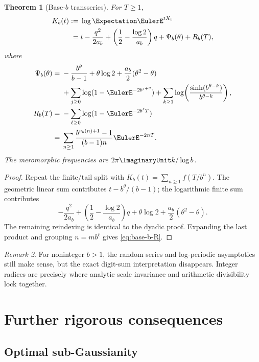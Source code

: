 \documentclass[11pt,oneside]{article}
\newtheorem{theorem}{Theorem}[section]
\theoremstyle{definition}
\theoremstyle{remark}
\newtheorem{remark}[theorem]{Remark}
\begin{document}
\begin{theorem}[Base-\(b\) transseries]
\label{thm:base-b-transseries}
For \(T\geq1\),
\begin{align}
 K_b(t)
 :={}&\log\Expectation\EulerE^{tX_b}
 \notag\\
 ={}&
 t-\frac{q^2}{2a_b}
 +\left(\frac12-\frac{\log2}{a_b}\right)q
 +\Psi_b(\theta)+R_b(T),
 \label{eq:base-b-K}
\end{align}
where
\begin{align}
 \Psi_b(\theta)
 ={}&
 -\frac{b^\theta}{b-1}
 +\theta\log2+\frac{a_b}{2}(\theta^2-\theta)
 \notag\\
 &+\sum_{j\geq0}\log(1-\EulerE^{-2b^{j+\theta}})
 +\sum_{k\geq1}
   \log\!\left(\frac{\sinh(b^{\theta-k})}{b^{\theta-k}}\right),
 \label{eq:base-b-Psi}\\
 R_b(T)
 ={}&
 -\sum_{\ell\geq0}\log(1-\EulerE^{-2b^\ell T})
 \notag\\
 ={}&
 \sum_{n\geq1}
 \frac{b^{\nu_b(n)+1}-1}{(b-1)n}\EulerE^{-2nT}.
 \label{eq:base-b-R}
\end{align}
The meromorphic frequencies are
\(2\pi\ImaginaryUnit k/\log b\).
\end{theorem}

\begin{proof}
Repeat the finite/tail split with
\(K_b(t)=\sum_{n\geq1}f(T/b^n)\).  The geometric linear sum contributes
\(t-b^\theta/(b-1)\); the logarithmic finite sum contributes
\[
 -\frac{q^2}{2a_b}
 +\left(\frac12-\frac{\log2}{a_b}\right)q
 +\theta\log2+\frac{a_b}{2}(\theta^2-\theta).
\]
The remaining reindexing is identical to the dyadic proof.  Expanding the
last product and grouping \(n=mb^\ell\) gives \eqref{eq:base-b-R}.
\end{proof}

\begin{remark}
For noninteger \(b>1\), the random series and log-periodic asymptotics still
make sense, but the exact digit-sum interpretation disappears.  Integer
radices are precisely where analytic scale invariance and arithmetic
divisibility lock together.
\end{remark}

\section{Further rigorous consequences}

\subsection{Optimal sub-Gaussianity}
\end{document}
